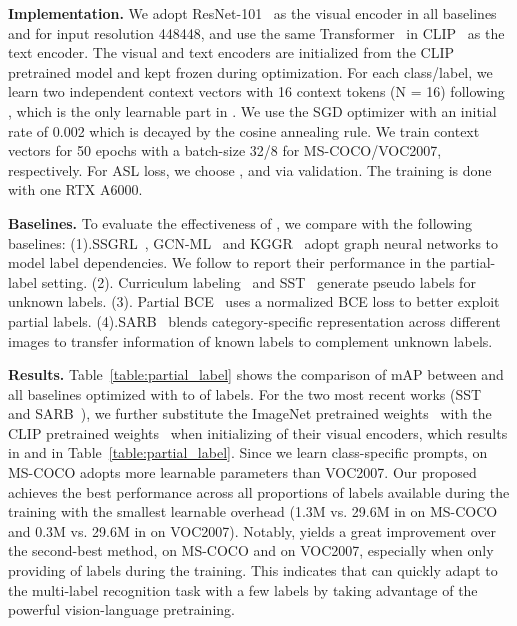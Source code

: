 \textbf{Implementation.} We adopt ResNet-101~\cite{he2016deep} as the visual encoder in all baselines and \ours for input resolution 448448,  and use the same Transformer~\cite{radford2019language,vaswani2017attention} in CLIP~\cite{radford2021learning} as the text encoder. The visual and text encoders are initialized from the CLIP pretrained model and kept frozen during optimization. For each class/label, we learn two independent context vectors with 16 context tokens (N = 16) following \cite{zhou2021learning}, which is the only learnable part in \ours. We use the SGD optimizer with an initial rate of 0.002 which is decayed by the cosine annealing rule. We train context vectors for 50 epochs with a batch-size 32/8 for MS-COCO/VOC2007, respectively. For ASL loss, we choose ,  and  via validation. The training is done with one RTX A6000.

\textbf{Baselines.} To evaluate the effectiveness of \ours, we compare with the following baselines: (1).SSGRL~\cite{chen2019learning}, GCN-ML~\cite{chen2019multi} and KGGR~\cite{chen2020knowledge} adopt graph neural networks to model label dependencies. We follow \cite{chen2022structured} to report their performance in the partial-label setting. (2). Curriculum labeling~\cite{durand2019learning} and  SST~\cite{chen2022structured} generate pseudo labels for unknown labels. (3). Partial BCE~\cite{durand2019learning} uses a normalized BCE loss to better exploit partial labels. (4).SARB~\cite{pu2022semantic} blends category-specific representation across different images to transfer information of known labels to complement unknown labels.


\textbf{Results.} 
Table~\ref{table:partial_label} shows the comparison of mAP between \ours and all baselines optimized with  to  of labels. For the two most recent works (SST~\cite{chen2022structured} and SARB~\cite{pu2022semantic}), we further substitute the ImageNet pretrained weights~\cite{he2016deep} with the CLIP pretrained weights~\cite{radford2021learning} when initializing of their visual encoders, which results in  and  in Table~\ref{table:partial_label}. Since we learn class-specific prompts, \ours on MS-COCO adopts more learnable parameters than VOC2007. Our proposed \ours achieves the best performance across all  proportions of labels available during the training with the smallest learnable overhead (1.3M vs. 29.6M in  on MS-COCO and 0.3M vs. 29.6M in  on VOC2007). Notably, \ours yields a great improvement over the second-best method,  on MS-COCO and  on VOC2007,  especially when only providing  of labels during the training. This indicates that \ours can quickly adapt to the multi-label recognition task with a few labels by taking advantage of the powerful vision-language pretraining.

